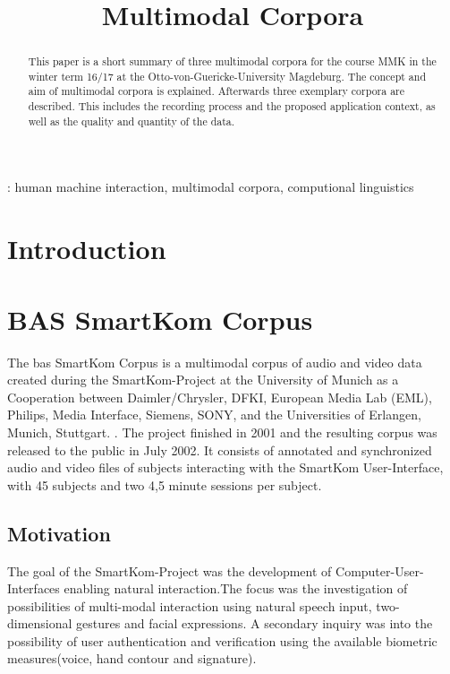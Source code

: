\documentclass[a4paper]{article}
\title{Multimodal Corpora}
\begin{document}
	\maketitle
  	\begin{abstract}
    	This paper is a short summary of three multimodal corpora for the course MMK in the winter term 16/17 at the Otto-von-Guericke-University Magdeburg. The concept and aim of multimodal corpora is explained. Afterwards three exemplary corpora are described. This includes the recording process and the proposed application context, as well as the quality and quantity of the data.
  	\end{abstract}
  	: human machine interaction, multimodal corpora, computional linguistics
  	
	
  	\section{Introduction}


	\section{BAS SmartKom Corpus} 
		The \gls{bas} SmartKom Corpus is a multimodal corpus of audio and video data created during the SmartKom-Project at the University of Munich as a Cooperation between Daimler/Chrysler, DFKI, European Media Lab (EML), Philips, Media Interface, Siemens,	SONY, and the Universities of Erlangen, Munich, Stuttgart. \cite{schiel2002smartkom}. The project finished in 2001 and the resulting corpus was released to the public in July 2002. It consists of annotated and synchronized audio and video files of subjects interacting with the SmartKom User-Interface, with 45 subjects and two 4,5 minute sessions per subject.
		\subsection{Motivation}
			 The goal of the SmartKom-Project  was the development of Computer-User-Interfaces enabling natural interaction.The focus was the investigation of possibilities of multi-modal interaction using natural speech input, two-dimensional gestures and facial expressions.
			 A secondary inquiry was into the possibility of user authentication and verification using the available biometric measures(voice, hand contour and signature).
				 
\end{document}
